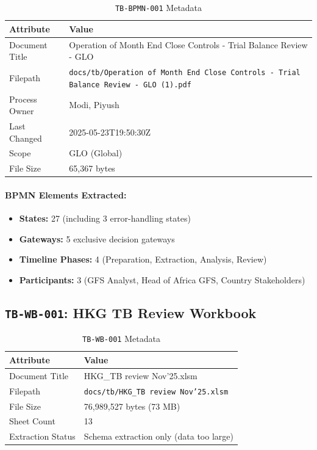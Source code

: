 \documentclass[11pt,a4paper,twoside]{report}
\newcommand{\srcref}[1]{\texttt{#1}}
\begin{document}
\begin{table}[h]
\centering
\caption{\srcref{TB-BPMN-001} Metadata}
\begin{tabularx}{\textwidth}{@{}L{4cm}L{10cm}@{}}
\toprule
\textbf{Attribute} & \textbf{Value} \\
\midrule
Document Title & Operation of Month End Close Controls - Trial Balance Review - GLO \\
Filepath & \texttt{docs/tb/Operation of Month End Close Controls - Trial Balance Review - GLO (1).pdf} \\
Process Owner & Modi, Piyush \\
Last Changed & 2025-05-23T19:50:30Z \\
Scope & GLO (Global) \\
File Size & 65,367 bytes \\
\bottomrule
\end{tabularx}
\end{table}

\paragraph{BPMN Elements Extracted:}
\begin{itemize}[noitemsep]
\item \textbf{States:} 27 (including 3 error-handling states)
\item \textbf{Gateways:} 5 exclusive decision gateways
\item \textbf{Timeline Phases:} 4 (Preparation, Extraction, Analysis, Review)
\item \textbf{Participants:} 3 (GFS Analyst, Head of Africa GFS, Country Stakeholders)
\end{itemize}

\subsection{\srcref{TB-WB-001}: HKG TB Review Workbook}
\label{sec:tb-wb-001}

\begin{table}[h]
\centering
\caption{\srcref{TB-WB-001} Metadata}
\begin{tabularx}{\textwidth}{@{}L{4cm}L{10cm}@{}}
\toprule
\textbf{Attribute} & \textbf{Value} \\
\midrule
Document Title & HKG\_TB review Nov'25.xlsm \\
Filepath & \texttt{docs/tb/HKG\_TB review Nov'25.xlsm} \\
File Size & 76,989,527 bytes (73 MB) \\
Sheet Count & 13 \\
Extraction Status & Schema extraction only (data too large) \\
\bottomrule
\end{tabularx}
\end{table}
\end{document}
